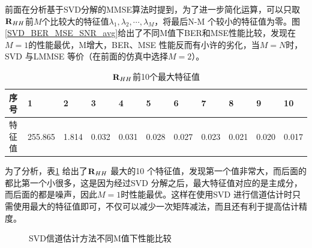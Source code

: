 前面在分析基于SVD分解的MMSE算法时提到，为了进一步简化运算，可以只取$\textbf R_{HH}$前$M$个比较大的特征值$\lambda_1,\lambda_2,\cdots,\lambda_M$，将最后N-M 个较小的特征值为零。图\ref{SVD_BER_MSE_SNR_avg}给出了不同M值下BER和MSE性能比较，发现在$M=1$的性能最优，M增大，BER、MSE 性能反而有小许的劣化，当$M=N$时，SVD 与LMMSE 等价（在前面的仿真中选择$M=2$）。
\begin{table}[ht]
    \caption{$\textbf R_{HH}$前10个最大特征值}
    \label{tab:modOrder}
    \centering
    \begin{tabular}{lllllllllll}
        \toprule
        序号 & 1 & 2& 3& 4&5& 6& 7& 8& 9&10 \\
        \midrule
        特征值 &255.865 &1.814&0.032&0.031 & 0.028 & 0.027&0.023&0.021&0.020&0.017\\
        \bottomrule
    \end{tabular}
    \label{tab:tezhengzhi}
\end{table}
为了分析，表\ref{tab:tezhengzhi} 给出了$\textbf R_{HH}$ 最大的10 个特征值，发现第一个值非常大，而后面的都比第一个小很多，这是因为经过SVD 分解之后，最大特征值对应的是主成分，而后面的都是噪声，因此$M=1$时性能最优。这样在使用SVD 进行信道估计时只需使用最大的特征值即可，不仅可以减少一次矩阵减法，而且还有利于提高估计精度。
\begin{figure}[htbp]
    \centering
    \caption{SVD信道估计方法不同M值下性能比较}
    \label{fig:SVD_BER_MSE_SNR_avg}
\end{figure}
